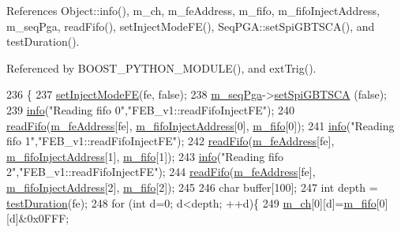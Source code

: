 References Object\+::info(), m\+\_\+ch, m\+\_\+fe\+Address, m\+\_\+fifo, m\+\_\+fifo\+Inject\+Address, m\+\_\+seq\+Pga, read\+Fifo(), set\+Inject\+Mode\+F\+E(), Seq\+P\+G\+A\+::set\+Spi\+G\+B\+T\+S\+C\+A(), and test\+Duration().



Referenced by B\+O\+O\+S\+T\+\_\+\+P\+Y\+T\+H\+O\+N\+\_\+\+M\+O\+D\+U\+L\+E(), and ext\+Trig().


\begin{DoxyCode}
236                                                 \{
237   \hyperlink{classFEB__v1_aea3983d847c7b8053485ddd16af65680}{setInjectModeFE}(fe, \textcolor{keyword}{false});
238   \hyperlink{classFEB__v1_a6c7804ac86796f233a8393043adf2e77}{m\_seqPga}->\hyperlink{classSeqPGA_ae5449d6970bffd8de3670a8a1ce6942d}{setSpiGBTSCA} (\textcolor{keyword}{false});
239   \hyperlink{classObject_a644fd329ea4cb85f54fa6846484b84a8}{info}(\textcolor{stringliteral}{"Reading fifo 0"},\textcolor{stringliteral}{"FEB\_v1::readFifoInjectFE"});
240   \hyperlink{classFEB__v1_af945f99a912c5ad076ebdb03dbb6c139}{readFifo}(\hyperlink{classFEB__v1_a4e1945c2d5b434125f375e9d0fc6d99f}{m\_feAddress}[fe], \hyperlink{classFEB__v1_afd035f292061e1823ed64471bb0228ef}{m\_fifoInjectAddress}[0], 
      \hyperlink{classFEB__v1_ae5b770f2f5ffb97324862c93e3153985}{m\_fifo}[0]);
241   \hyperlink{classObject_a644fd329ea4cb85f54fa6846484b84a8}{info}(\textcolor{stringliteral}{"Reading fifo 1"},\textcolor{stringliteral}{"FEB\_v1::readFifoInjectFE"});
242   \hyperlink{classFEB__v1_af945f99a912c5ad076ebdb03dbb6c139}{readFifo}(\hyperlink{classFEB__v1_a4e1945c2d5b434125f375e9d0fc6d99f}{m\_feAddress}[fe], \hyperlink{classFEB__v1_afd035f292061e1823ed64471bb0228ef}{m\_fifoInjectAddress}[1], 
      \hyperlink{classFEB__v1_ae5b770f2f5ffb97324862c93e3153985}{m\_fifo}[1]);
243   \hyperlink{classObject_a644fd329ea4cb85f54fa6846484b84a8}{info}(\textcolor{stringliteral}{"Reading fifo 2"},\textcolor{stringliteral}{"FEB\_v1::readFifoInjectFE"});
244   \hyperlink{classFEB__v1_af945f99a912c5ad076ebdb03dbb6c139}{readFifo}(\hyperlink{classFEB__v1_a4e1945c2d5b434125f375e9d0fc6d99f}{m\_feAddress}[fe], \hyperlink{classFEB__v1_afd035f292061e1823ed64471bb0228ef}{m\_fifoInjectAddress}[2], 
      \hyperlink{classFEB__v1_ae5b770f2f5ffb97324862c93e3153985}{m\_fifo}[2]);
245   
246   \textcolor{keywordtype}{char} buffer[100];
247   \textcolor{keywordtype}{int} depth = \hyperlink{classFEB__v1_a7f1db8ca9490172fce7603da9e703dec}{testDuration}(fe);
248   \textcolor{keywordflow}{for} (\textcolor{keywordtype}{int} d=0; d<depth; ++d)\{ 
249     \hyperlink{classFEB__v1_a383c35f10769b16c6a719494594899c6}{m\_ch}[0][d]=\hyperlink{classFEB__v1_ae5b770f2f5ffb97324862c93e3153985}{m\_fifo}[0][d]&0x0FFF;

\end{DoxyCode}
